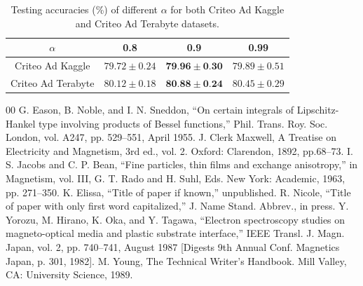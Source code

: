 \documentclass[conference]{IEEEtran}
\begin{document}
\begin{table}[!h]
\centering
\begin{tabular}{cccc}
\hline
$\alpha$ & 0.8 & 0.9 & 0.99 \\
\hline
Criteo Ad Kaggle & $79.72 \pm 0.24$ & $\mathbf{7 9 . 9 6} \pm \mathbf{0 . 3 0}$ & $79.89 \pm 0.51$ \\
Criteo Ad Terabyte & $80.12 \pm 0.18$ & $\mathbf{8 0 . 8 8} \pm \mathbf{0 . 2 4}$ & $80.45 \pm 0.29$ \\
\hline
\end{tabular}
\caption{Testing accuracies (\%) of different $\alpha$ for both Criteo Ad Kaggle and Criteo Ad Terabyte datasets.}
\end{table}

\begin{thebibliography}{00}
 G. Eason, B. Noble, and I. N. Sneddon, ``On certain integrals of Lipschitz-Hankel type involving products of Bessel functions,'' Phil. Trans. Roy. Soc. London, vol. A247, pp. 529--551, April 1955.
 J. Clerk Maxwell, A Treatise on Electricity and Magnetism, 3rd ed., vol. 2. Oxford: Clarendon, 1892, pp.68--73.
 I. S. Jacobs and C. P. Bean, ``Fine particles, thin films and exchange anisotropy,'' in Magnetism, vol. III, G. T. Rado and H. Suhl, Eds. New York: Academic, 1963, pp. 271--350.
 K. Elissa, ``Title of paper if known,'' unpublished.
 R. Nicole, ``Title of paper with only first word capitalized,'' J. Name Stand. Abbrev., in press.
 Y. Yorozu, M. Hirano, K. Oka, and Y. Tagawa, ``Electron spectroscopy studies on magneto-optical media and plastic substrate interface,'' IEEE Transl. J. Magn. Japan, vol. 2, pp. 740--741, August 1987 [Digests 9th Annual Conf. Magnetics Japan, p. 301, 1982].
 M. Young, The Technical Writer's Handbook. Mill Valley, CA: University Science, 1989.
\end{thebibliography}
\end{document}
